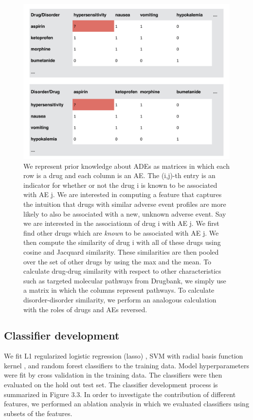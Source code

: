 \begin{figure}
  \begin{center}
    \includegraphics[width=0.9\linewidth]{ch3-figures/Figure2.pdf}
  \end{center}
  \caption[Calculating drug-drug and disorder-disorder similarity]{
    We represent prior knowledge about ADEs as matrices in which each row is a
    drug and each column is an AE.  The (i,j)-th entry is an indicator
    for whether or not the drug i is known to be associated with AE
    j.  We are interested in computing a feature that captures the
    intuition that drugs with similar adverse event profiles are more
    likely to also be associated with a new, unknown adverse event.
    Say we are interested in the associationn of drug i with AE j.  We
    first find other drugs which are \emph{known} to be associated
    with AE j.  We then compute the similarity of drug i with all of
    these drugs using cosine and Jacquard similarity.  These
    similarities are then pooled over the set of other drugs by using
    the max and the mean.  To calculate drug-drug similarity with
    respect to other characteristics such as targeted molecular
    pathways from Drugbank, we simply use a matrix in which the
    columns represent pathways.  To calculate disorder-disorder
    similarity, we perform an analogous calculation with the roles of
    drugs and AEs reversed.}
  \label{fig:short}
\end{figure}


\subsection{Classifier development}
We fit L1 regularized logistic regression (lasso) \cite{Lasso}, SVM
with radial basis function kernel \cite{SVM} , and random forest
classifiers \cite{Liaw2002} to the training data. Model
hyperparameters were fit by cross validation in the training data.
The classifiers were then evaluated on the hold out test set. The
classifier development process is summarized in Figure 3.3. In order
to investigate the contribution of different features, we performed an
ablation analysis in which we evaluated classifiers using subsets of
the features.

